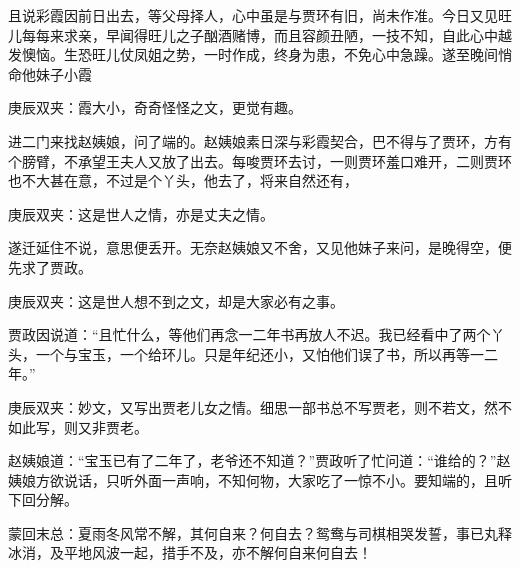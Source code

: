 \begin{parag}
    且说彩霞因前日出去，等父母择人，心中虽是与贾环有旧，尚未作准。今日又见旺儿每每来求亲，早闻得旺儿之子酗酒赌博，而且容颜丑陋，一技不知，自此心中越发懊恼。生恐旺儿仗凤姐之势，一时作成，终身为患，不免心中急躁。遂至晚间悄命他妹子小霞\begin{note}庚辰双夹：霞大小，奇奇怪怪之文，更觉有趣。\end{note}进二门来找赵姨娘，问了端的。赵姨娘素日深与彩霞契合，巴不得与了贾环，方有个膀臂，不承望王夫人又放了出去。每唆贾环去讨，一则贾环羞口难开，二则贾环也不大甚在意，不过是个丫头，他去了，将来自然还有，\begin{note}庚辰双夹：这是世人之情，亦是丈夫之情。\end{note}遂迁延住不说，意思便丢开。无奈赵姨娘又不舍，又见他妹子来问，是晚得空，便先求了贾政。\begin{note}庚辰双夹：这是世人想不到之文，却是大家必有之事。\end{note}贾政因说道：“且忙什么，等他们再念一二年书再放人不迟。我已经看中了两个丫头，一个与宝玉，一个给环儿。只是年纪还小，又怕他们误了书，所以再等一二年。”\begin{note}庚辰双夹：妙文，又写出贾老儿女之情。细思一部书总不写贾老，则不若文，然不如此写，则又非贾老。\end{note}赵姨娘道：“宝玉已有了二年了，老爷还不知道？”贾政听了忙问道：“谁给的？”赵姨娘方欲说话，只听外面一声响，不知何物，大家吃了一惊不小。要知端的，且听下回分解。
\end{parag}


\begin{parag}
    \begin{note}蒙回末总：夏雨冬风常不解，其何自来？何自去？鸳鸯与司棋相哭发誓，事已丸释冰消，及平地风波一起，措手不及，亦不解何自来何自去！\end{note}
\end{parag}
